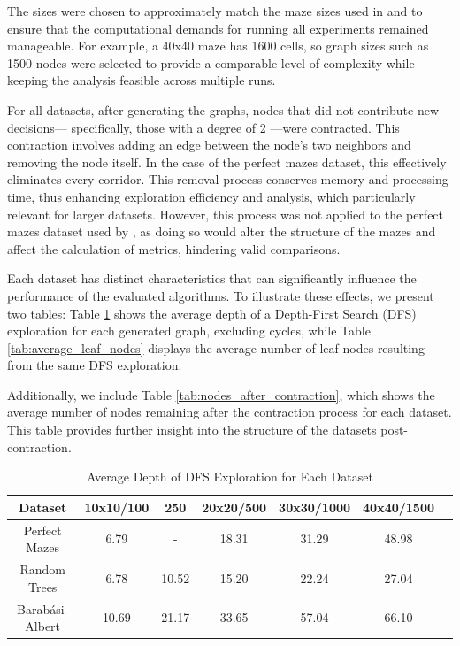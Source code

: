 The sizes were chosen to approximately match the maze sizes used in  and to ensure that the computational demands for running all experiments remained manageable. For example, a 40x40 maze has 1600 cells, so graph sizes such as 1500 nodes were selected to provide a comparable level of complexity while keeping the analysis feasible across multiple runs.

For all datasets, after generating the graphs, nodes that did not contribute new decisions— specifically, those with a degree of 2 —were contracted. This contraction involves adding an edge between the node's two neighbors and removing the node itself. In the case of the perfect mazes dataset, this effectively eliminates every corridor. This removal process conserves memory and processing time, thus enhancing exploration efficiency and analysis, which particularly relevant for larger datasets. However, this process was not applied to the perfect mazes dataset used by , as doing so would alter the structure of the mazes and affect the calculation of metrics, hindering valid comparisons.

Each dataset has distinct characteristics that can significantly influence the performance of the evaluated algorithms. To illustrate these effects, we present two tables: Table \ref{tab:average_depth} shows the average depth of a Depth-First Search (DFS) exploration for each generated graph, excluding cycles, while Table \ref{tab:average_leaf_nodes} displays the average number of leaf nodes resulting from the same DFS exploration.

Additionally, we include Table \ref{tab:nodes_after_contraction}, which shows the average number of nodes remaining after the contraction process for each dataset. This table provides further insight into the structure of the datasets post-contraction.

\begin{table}[H]
    \centering
    \caption{Average Depth of DFS Exploration for Each Dataset}
    \label{tab:average_depth}
    \begin{tabular}{|c|c|c|c|c|c|c|} 
        \hline
        \textbf{Dataset} & \textbf{10x10/100} & \textbf{250} & \textbf{20x20/500} & \textbf{30x30/1000} & \textbf{40x40/1500} \\ 
        \hline
        Perfect Mazes & 6.79 & - & 18.31 & 31.29 & 48.98 \\ 
        \hline
        Random Trees & 6.78 & 10.52 & 15.20 & 22.24 & 27.04 \\ 
        \hline
        Barabási-Albert & 10.69 & 21.17 & 33.65 & 57.04 & 66.10 \\ 
        \hline
    \end{tabular}
\end{table}


